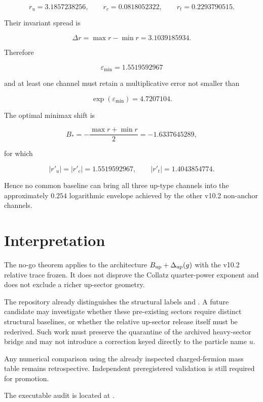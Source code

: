 \[
r_u=3.1857238256,
\qquad
r_c=0.0818052322,
\qquad
r_t=0.2293790515.
\]

Their invariant spread is

\begin{equation}
\Delta r
=
\max r-\min r
=
3.1039185934.
\label{eq:up_residual_spread}
\end{equation}

Therefore

\begin{equation}
\boxed{
\varepsilon_{\min}=1.5519592967
}
\label{eq:up_minimax_error}
\end{equation}

and at least one channel must retain a multiplicative error not smaller than

\begin{equation}
\boxed{
\exp(\varepsilon_{\min})=4.7207104.
}
\label{eq:up_minimax_factor}
\end{equation}

The optimal minimax shift is

\[
B_*=-\frac{\max r+\min r}{2}=-1.6337645289,
\]

for which

\[
|r'_u|=|r'_c|=1.5519592967,
\qquad
|r'_t|=1.4043854774.
\]

Hence no common baseline can bring all three up-type channels into the
approximately $0.254$ logarithmic envelope achieved by the other v10.2
non-anchor channels.

\section{Interpretation}

The no-go theorem applies to the architecture
$B_{\rm up}+\Delta_{\rm up}(g)$ with the v10.2 relative trace frozen.  It does
not disprove the Collatz quarter-power exponent and does not exclude a richer
up-sector geometry.

The repository already distinguishes the structural labels
 and .  A future
candidate may investigate whether these pre-existing sectors require distinct
structural baselines, or whether the relative up-sector release itself must be
rederived.  Such work must preserve the quarantine of the archived heavy-sector
bridge and may not introduce a correction keyed directly to the particle name
$u$.

Any numerical comparison using the already inspected charged-fermion mass table
remains retrospective.  Independent preregistered validation is still required
for promotion.

The executable audit is located at
.
